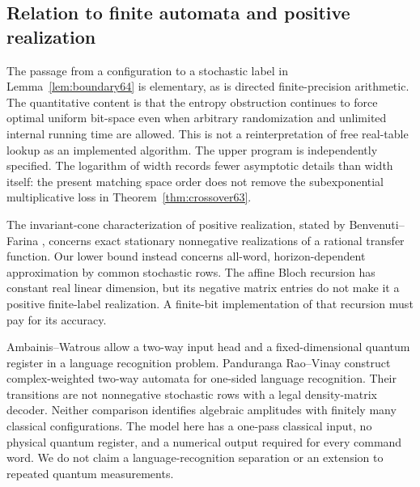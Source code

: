 \subsection{Relation to finite automata and positive realization}
The passage from a configuration to a stochastic label in
Lemma~\ref{lem:boundary64} is elementary, as is directed finite-precision
arithmetic. The quantitative content is that the entropy obstruction
continues to force optimal uniform bit-space even when arbitrary
randomization and unlimited internal running time are allowed.
This is not a reinterpretation of free real-table lookup as an
implemented algorithm. The upper program is independently specified.
The logarithm of width records fewer asymptotic details than width
itself: the present matching space order does not remove the
subexponential multiplicative loss in Theorem~\ref{thm:crossover63}.

The invariant-cone characterization of positive realization, stated by
Benvenuti--Farina \cite[Theorem~2]{BF04}, concerns exact stationary
nonnegative realizations of a rational transfer function. Our lower
bound instead concerns all-word, horizon-dependent approximation by
common stochastic rows. The affine Bloch recursion has constant real
linear dimension, but its negative matrix entries do not make it a
positive finite-label realization. A finite-bit implementation of that
recursion must pay for its accuracy.

Ambainis--Watrous \cite[Section~2 and Theorem~1]{AW64} allow a two-way
input head and a fixed-dimensional quantum register in a language
recognition problem. Panduranga Rao--Vinay
\cite[Theorem~1]{RV64} construct complex-weighted two-way automata
for one-sided language recognition. Their transitions are not
nonnegative stochastic rows with a legal density-matrix decoder.
Neither comparison identifies algebraic amplitudes with finitely many
classical configurations. The model here has a one-pass classical
input, no physical quantum register, and a numerical output required
for every command word. We do not claim a language-recognition
separation or an extension to repeated quantum measurements.
